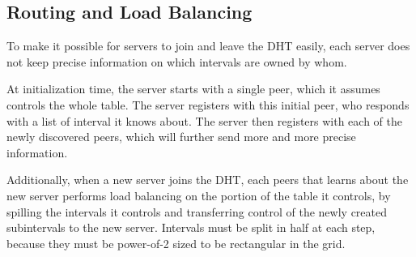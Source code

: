 
\subsection{Routing and Load Balancing}

To make it possible for servers to join and leave the DHT easily, each server does not keep precise information on which intervals are owned by whom.

At initialization time, the server starts with a single peer, which it assumes controls the whole table.
The server registers with this initial peer, who responds with a list of interval it knows about.
The server then registers with each of the newly discovered peers, which will further send more and more precise information.

Additionally, when a new server joins the DHT, each peers that learns about the new server performs load balancing on the portion of the table it controls, by spilling the intervals it controls and transferring control of the newly created subintervals to the new server.
Intervals must be split in half at each step, because they must be power-of-2 sized to be rectangular in the grid.

